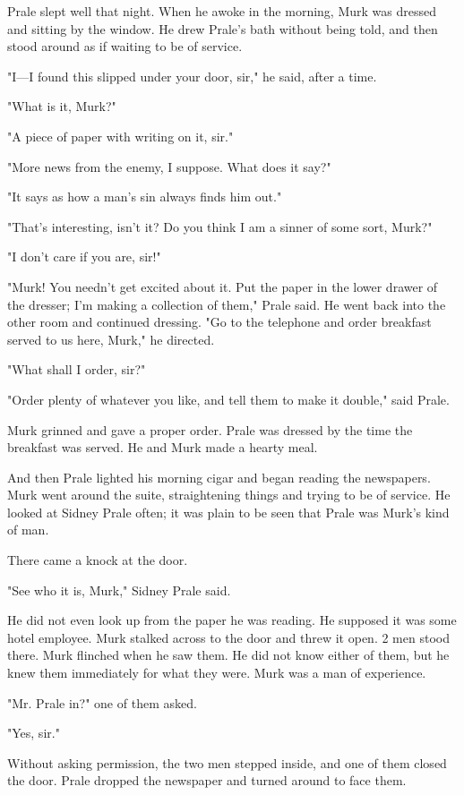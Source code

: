 \documentclass{novel}
\begin{document}
Prale slept well that night. When he awoke in the morning, Murk was dressed and sitting by the window. He drew Prale's bath without being told, and then stood around as if waiting to be of service.

"I---I found this slipped under your door, sir," he said, after a time.

"What is it, Murk?"

"A piece of paper with writing on it, sir."

"More news from the enemy, I suppose. What does it say?"

"It says as how a man's sin always finds him out."

"That's interesting, isn't it? Do you think I am a sinner of some sort, Murk?"

"I don't care if you are, sir!"

"Murk! You needn't get excited about it. Put the paper in the lower drawer of the dresser; I'm making a collection of them," Prale said. He went back into the other room and continued dressing. "Go to the telephone and order breakfast served to us here, Murk," he directed.

"What shall I order, sir?"

"Order plenty of whatever you like, and tell them to make it double," said Prale.

Murk grinned and gave a proper order. Prale was dressed by the time the breakfast was served. He and Murk made a hearty meal.

And then Prale lighted his morning cigar and began reading the newspapers. Murk went around the suite, straightening things and trying to be of service. He looked at Sidney Prale often; it was plain to be seen that Prale was Murk's kind of man.

There came a knock at the door.

"See who it is, Murk," Sidney Prale said.

He did not even look up from the paper he was reading. He supposed it was some hotel employee. Murk stalked across to the door and threw it open. 2 men stood there. Murk flinched when he saw them. He did not know either of them, but he knew them immediately for what they were. Murk was a man of experience.

"Mr. Prale in?" one of them asked.

"Yes, sir."

Without asking permission, the two men stepped inside, and one of them closed the door. Prale dropped the newspaper and turned around to face them.
\end{document}
